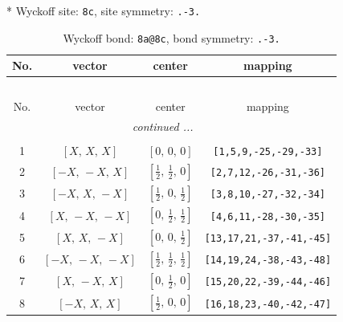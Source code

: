 \documentclass[fleqn,8pt]{jsarticle}
\begin{document}
* Wyckoff site: {\tt 8c}, site symmetry: {\tt .-3.}
\renewcommand{\arraystretch}{1.2}
\begin{longtable}{cccc}
\caption{Wyckoff bond: {\tt 8a@8c}, bond symmetry: {\tt .-3.}}
 \\
 \hline \hline
No. & vector & center & mapping \\ \hline \endfirsthead

\multicolumn{3}{l}{\tablename\ \thetable{}} \\
 \hline \hline
No. & vector & center & mapping \\ \hline \endhead

 \hline \hline
\multicolumn{3}{r}{\footnotesize\it continued ...} \\ \endfoot

 \hline \hline
\multicolumn{3}{r}{} \\ \endlastfoot

1 & $\left[ X,\, X,\, X \right]$ & $\left[ 0,\, 0,\, 0 \right]$ & {\tt [1,5,9,-25,-29,-33]} \\ \hline
2 & $\left[ - X,\, - X,\, X \right]$ & $\left[ \frac{1}{2},\, \frac{1}{2},\, 0 \right]$ & {\tt [2,7,12,-26,-31,-36]} \\ \hline
3 & $\left[ - X,\, X,\, - X \right]$ & $\left[ \frac{1}{2},\, 0,\, \frac{1}{2} \right]$ & {\tt [3,8,10,-27,-32,-34]} \\ \hline
4 & $\left[ X,\, - X,\, - X \right]$ & $\left[ 0,\, \frac{1}{2},\, \frac{1}{2} \right]$ & {\tt [4,6,11,-28,-30,-35]} \\ \hline
5 & $\left[ X,\, X,\, - X \right]$ & $\left[ 0,\, 0,\, \frac{1}{2} \right]$ & {\tt [13,17,21,-37,-41,-45]} \\ \hline
6 & $\left[ - X,\, - X,\, - X \right]$ & $\left[ \frac{1}{2},\, \frac{1}{2},\, \frac{1}{2} \right]$ & {\tt [14,19,24,-38,-43,-48]} \\ \hline
7 & $\left[ X,\, - X,\, X \right]$ & $\left[ 0,\, \frac{1}{2},\, 0 \right]$ & {\tt [15,20,22,-39,-44,-46]} \\ \hline
8 & $\left[ - X,\, X,\, X \right]$ & $\left[ \frac{1}{2},\, 0,\, 0 \right]$ & {\tt [16,18,23,-40,-42,-47]} \\
\end{longtable}
\renewcommand{\arraystretch}{1.2}
\end{document}
